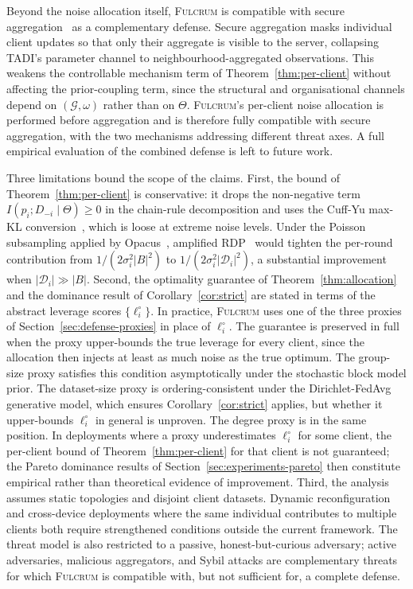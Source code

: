 \documentclass[letterpaper,journal]{IEEEtran}
\newcommand{\TADI}{\textsc{TADI}\xspace}
\newcommand{\Fulcrum}{\textsc{Fulcrum}\xspace}
\begin{document}
Beyond the noise allocation itself, \Fulcrum is compatible with
secure aggregation~\cite{bonawitz2017secagg} as a complementary
defense. Secure aggregation masks individual client updates so that
only their aggregate is visible to the server, collapsing \TADI's
parameter channel to neighbourhood-aggregated observations. This
weakens the controllable mechanism term of
Theorem~\ref{thm:per-client} without affecting the prior-coupling
term, since the structural and organisational channels depend on
$(\mathcal{G}, \omega)$ rather than on $\Theta$. \Fulcrum's
per-client noise allocation is performed before aggregation and is
therefore fully compatible with secure aggregation, with the two
mechanisms addressing different threat axes. A full empirical
evaluation of the combined defense is left to future work.

Three limitations bound the scope of the claims. First, the bound
of Theorem~\ref{thm:per-client} is conservative: it drops the
non-negative term $I(p_i; D_{-i} \mid \Theta) \geq 0$ in the
chain-rule decomposition and uses the Cuff-Yu max-KL
conversion~\cite{cuff2016mi}, which is loose at extreme noise
levels. Under the Poisson subsampling applied by
Opacus~\cite{yousefpour2021opacus}, amplified
RDP~\cite{wang2019subsampled} would tighten the per-round
contribution from $1/(2\sigma_i^2|B|^2)$ to
$1/(2\sigma_i^2|\mathcal{D}_i|^2)$, a substantial improvement when
$|\mathcal{D}_i| \gg |B|$. Second, the optimality guarantee of
Theorem~\ref{thm:allocation} and the dominance result of
Corollary~\ref{cor:strict} are stated in terms of the abstract
leverage scores $\{\ell_i^\circ\}$. In practice, \Fulcrum uses one
of the three proxies of Section~\ref{sec:defense-proxies} in place
of $\ell_i^\circ$. The guarantee is preserved in full when the proxy
upper-bounds the true leverage for every client, since the
allocation then injects at least as much noise as the true optimum.
The group-size proxy satisfies this condition asymptotically under
the stochastic block model prior. The dataset-size proxy is
ordering-consistent under the Dirichlet-FedAvg generative model,
which ensures Corollary~\ref{cor:strict} applies, but whether it
upper-bounds $\ell_i^\circ$ in general is unproven. The degree
proxy is in the same position. In deployments where a proxy
underestimates $\ell_i^\circ$ for some client, the per-client bound
of Theorem~\ref{thm:per-client} for that client is not guaranteed;
the Pareto dominance results of
Section~\ref{sec:experiments-pareto} then constitute empirical
rather than theoretical evidence of improvement. Third, the
analysis assumes static topologies and disjoint client datasets.
Dynamic reconfiguration and cross-device deployments where the same
individual contributes to multiple clients both require strengthened
conditions outside the current framework. The threat model is also
restricted to a passive, honest-but-curious adversary; active
adversaries, malicious aggregators, and Sybil attacks are
complementary threats for which \Fulcrum is compatible with, but
not sufficient for, a complete defense.
\end{document}
